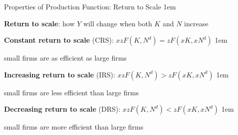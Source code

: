 \documentclass[11pt,aspectratio=43]{beamer} \usepackage[utf8]{inputenc}
\let\olditemize=\itemize
\let\endolditemize=\enditemize
\renewenvironment{itemize}{\olditemize \itemsep1em}{\endolditemize}
\theoremstyle{definition}
\begin{document}
\begin{frame}{Properties of Production Function: Return to Scale}
\label{slide:Properties_of_Production_Function__Return_to_Scale}
    \begin{itemize}
        \item \textbf{Return to scale}: how $ Y $ will change when both $ K $ and $ N $ increase
        \item \textbf{Constant return to scale} (CRS): $ x z F( K, N^{d} ) = z F( xK, xN^{d} ) $
        \begin{itemize}
            \item small firms are \alert{as efficient as} large firms
        \end{itemize}
        \item \textbf{Increasing return to scale} (IRS): $ x z F( K, N^{d} ) > z F( xK, xN^{d} ) $
        \begin{itemize}
            \item small firms are \alert{less efficient than} large firms
        \end{itemize}
        \item \textbf{Decreasing return to scale} (DRS): $ x z F( K, N^{d} ) < z F( xK, xN^{d} ) $
        \begin{itemize}
            \item small firms are \alert{more efficient than} large firms
        \end{itemize}
    \end{itemize}
\end{frame}
\end{document}
